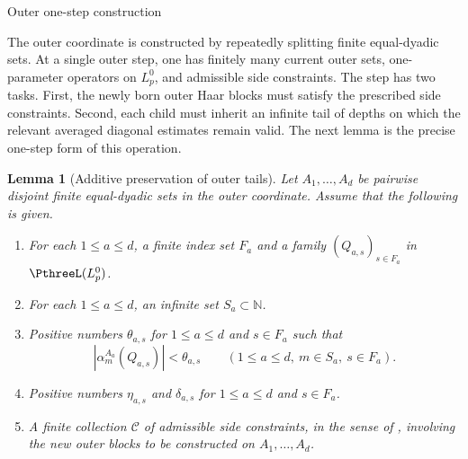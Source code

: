 \documentclass[11pt,reqno]{amsart}
\makeatletter
\theoremstyle{plain}
\newtheorem{lemma}[lemma]{Lemma}
\theoremstyle{definition}
\newcommand{\N}{\mathbb N}
\newcounter{problempaper}
\newenvironment{problempaperbody}{%
  \setcounter{subsection}{0}%
  \setcounter{subsubsection}{0}%
  \setcounter{paragraph}{0}%
  \renewcommand{\thesubsection}{\arabic{subsection}}%
  \renewcommand{\thesubsubsection}{\thesubsection.\arabic{subsubsection}}%
  \renewcommand{\theparagraph}{\thesubsubsection.\arabic{paragraph}}%
  \let\problem@outersection\section
  \let\problem@outersubsection\subsection
  \let\problem@outersubsubsection\subsubsection
  \let\problem@outerparagraph\paragraph
  \let\section\problem@papersection
  \let\subsection\problem@papersubsection
  \let\subsubsection\problem@papersubsubsection
}{%
  \let\section\problem@outersection
  \let\subsection\problem@outersubsection
  \let\subsubsection\problem@outersubsubsection
  \let\paragraph\problem@outerparagraph
}
\newcommand{\problem@target}[2]{%
  \hypertarget{problem-\theproblempaper-#1-#2}{}%
}
\newcommand{\problem@paperheading}[3]{%
  \par\bigskip
  \problem@target{#1}{#2}%
  \noindent{\large\bfseries #2.\quad #3\par}%
  \nobreak\smallskip
}
\newcommand{\problem@papersubheading}[3]{%
  \par\medskip
  \problem@target{#1}{#2}%
  \noindent{\normalsize\bfseries #2.\quad #3\par}%
  \nobreak\smallskip
}
\newcommand{\problem@papersubsubheading}[3]{%
  \par\smallskip
  \problem@target{#1}{#2}%
  \noindent{\normalsize\itshape #2.\quad #3.\ }%
}
\def\problem@papersection{%
  \@ifstar{\problem@papersectionstar}{\problem@papersectionnostar}%
}
\def\problem@papersectionstar#1{%
  \par\bigskip\noindent{\large\bfseries #1\par}\nobreak\smallskip
}
\def\problem@papersectionnostar#1{%
  \refstepcounter{subsection}%
  \setcounter{subsubsection}{0}%
  \setcounter{paragraph}{0}%
  \problem@paperheading{section}{\thesubsection}{#1}%
  \problem@writecontentsline{section}{\thesubsection}{#1}%
}
\def\problem@papersubsection{%
  \@ifstar{\problem@papersubsectionstar}{\problem@papersubsectionnostar}%
}
\def\problem@papersubsectionstar#1{%
  \par\medskip\noindent{\normalsize\bfseries #1\par}\nobreak\smallskip
}
\def\problem@papersubsectionnostar#1{%
  \refstepcounter{subsubsection}%
  \setcounter{paragraph}{0}%
  \problem@papersubheading{subsection}{\thesubsubsection}{#1}%
  \problem@writecontentsline{subsection}{\thesubsubsection}{#1}%
}
\def\problem@papersubsubsection{%
  \@ifstar{\problem@papersubsubsectionstar}{\problem@papersubsubsectionnostar}%
}
\def\problem@papersubsubsectionstar#1{%
  \par\smallskip\noindent{\normalsize\itshape #1.\ }%
}
\def\problem@papersubsubsectionnostar#1{%
  \refstepcounter{paragraph}%
  \problem@papersubsubheading{subsubsection}{\theparagraph}{#1}%
  \problem@writecontentsline{subsubsection}{\theparagraph}{#1}%
}
\newcommand{\problem@writecontentsline}[3]{%
  \begingroup
  \protected@write\@auxout{}{%
    \string\problemcontentsentry{\theproblempaper}{#1}{#2}{#3}{\thepage}%
  }%
  \endgroup
}
\newcommand{\problemcontentsentry}[5]{%
  \@ifundefined{problemcontents@#1}{%
    \expandafter\gdef\csname problemcontents@#1\endcsname{}%
  }{}%
  \expandafter\g@addto@macro\csname problemcontents@#1\endcsname{%
    \problemcontentsline{#1}{#2}{#3}{#4}{#5}%
  }%
}
\newcommand{\problemcontentslink}[4]{%
  \hyperlink{problem-#1-#2-#3}{#4}%
}
\newcommand{\problemcontentsline}[5]{%
  \ifstrequal{#2}{section}{%
    \par\noindent
    \problemcontentslink{#1}{#2}{#3}{\makebox[2.5em][l]{#3}#4}%
    \nobreak\dotfill
    \problemcontentslink{#1}{#2}{#3}{#5}\par
  }{%
    \ifstrequal{#2}{subsection}{%
      \par\noindent\hspace*{1.5em}%
      \problemcontentslink{#1}{#2}{#3}{\makebox[3.5em][l]{#3}#4}%
      \nobreak\dotfill
      \problemcontentslink{#1}{#2}{#3}{#5}\par
    }{%
      \par\noindent\hspace*{3em}%
      \problemcontentslink{#1}{#2}{#3}{\makebox[4.5em][l]{#3}#4}%
      \nobreak\dotfill
      \problemcontentslink{#1}{#2}{#3}{#5}\par
    }%
  }%
}
\makeatother
\begin{document}
\begin{problempaperbody}
\subsection{Outer one-step construction}
\label{p3:sec:outer-one-step-construction}

The outer coordinate is constructed by repeatedly splitting finite equal-dyadic sets. At a single outer step, one has finitely many current outer sets, one-parameter operators on $L_p^0$, and admissible side constraints. The step has two tasks. First, the newly born outer Haar blocks must satisfy the prescribed side constraints. Second, each child must inherit an infinite tail of depths on which the relevant averaged diagonal estimates remain valid. The next lemma is the precise one-step form of this operation.

\begin{lemma}[Additive preservation of outer tails]
\label{p3:lem:outer-tail}
Let $A_1,\ldots,A_d$ be pairwise disjoint finite equal-dyadic sets in the outer coordinate. Assume that the following is given.

\begin{enumerate}[label=\textup{(\alph*)}]
\item \label{p3:item:outer-tail-hyp-operators} For each $1\leq a\leq d$, a finite index set $F_a$ and a family $(Q_{a,s})_{s\in F_a}$ in $\PthreeL(L_p^0)$.

\item \label{p3:item:outer-tail-hyp-tails} For each $1\leq a\leq d$, an infinite set $S_a\subset\N$.

\item \label{p3:item:outer-tail-hyp-bounds} Positive numbers $\theta_{a,s}$ for $1\leq a\leq d$ and $s\in F_a$ such that
\begin{equation}
\label{p3:eq:outer-tail-hypothesis}
        |\alpha_m^{A_a}(Q_{a,s})|<\theta_{a,s}\qquad(1\leq a\leq d,\ m\in S_a,\ s\in F_a).
\end{equation}

\item \label{p3:item:outer-tail-hyp-tolerances} Positive numbers $\eta_{a,s}$ and $\delta_{a,s}$ for $1\leq a\leq d$ and $s\in F_a$.

\item \label{p3:item:outer-tail-hyp-side} A finite collection $\mathscr C$ of admissible side constraints, in the sense of , involving the new outer blocks to be constructed on $A_1,\ldots,A_d$.
\end{enumerate}


\end{lemma}
\end{problempaperbody}
\end{document}
